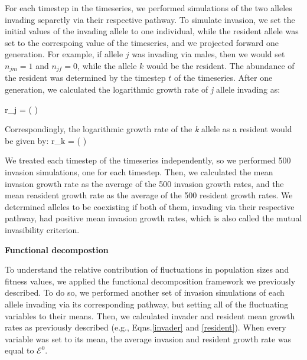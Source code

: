 \documentclass[12pt]{article}
\let\oldequation\equation
\let\oldendequation\endequation
\renewenvironment{equation}
  {\linenomathNonumbers\oldequation}
  {\oldendequation\endlinenomath}
\begin{document}
For each timestep in the timeseries, we performed simulations of the two alleles invading separetly via their respective pathway. To simulate invasion, we set the initial values of the invading allele to one individual, while the resident allele was set to the correspoing value of the timeseries, and we projected forward one generation. For example, if allele $j$ was invading via males, then we would set $n_{jm} = 1$ and $n_{jf}= 0$, while the allele $k$ would be the resident. The abundance of the resident was determined by the timestep $t$ of the timeseries. After one generation, we calculated the logarithmic growth rate of \textit{j} allele invading as:

\begin{equation}
r_{j} =	\ln \left (  \right )
\label{invader}
\end{equation}

Correspondingly, the logarithmic growth rate of the \textit{k} allele as a resident would be given by:
\begin{equation}
r_{k} =	\ln \left (  \right )
\label{resident}
\end{equation}

We treated each timestep of the timeseries independently, so we performed 500 invasion simulations, one for each timestep. Then, we calculated the mean invasion growth rate as the average of the 500 invasion growth rates, and the mean reasident growth rate as the average of the 500 resident growth rates. We determined alleles to be coexisting if both of them, invading via their respective pathway, had positive  mean invasion growth rates, which is also called the mutual invasibility criterion.

\vspace{5mm}
\noindent\textbf{Functional decompostion}

To understand the relative contribution of fluctuations in population sizes and fitness values, we applied the functional decomposition framework we previously described. To do so, we performed another set of invasion simulations of each allele invading via its corresponding pathway, but setting all of the  fluctuating variables to their means. Then, we calculated invader and resident mean growth rates as previously described (e.g., Eqns.\ref{invader} and \ref{resident}). When every variable was set to its mean, the average invasion and resident growth rate was equal to $\mathcal{E}^{0}$.
\end{document}
